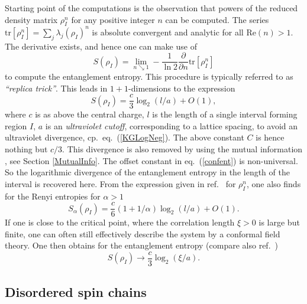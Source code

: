 \documentclass[12pt, rmp,floatfix,epsfig,graphics]{revtex4} %
\begin{document}
Starting point of the computations is the observation that powers 
of the reduced density matrix $\rho_I^n$ for any positive integer 
$n$ can be computed. The series 
$\text{tr}[\rho_I^n]= \sum_j \lambda_j(\rho_I)^n$ 
is absolute convergent and analytic for all
$\text{Re}(n)>1$. The derivative exists, and hence one can make use of
\begin{equation*}
        S(\rho_I)=\lim_{n\searrow 1}
        -\frac{1}{\ln 2} \frac{\partial}{\partial n}\text{tr}[\rho_I^n]
\end{equation*}
to compute the entanglement entropy. This procedure is 
typically referred to as {\it ``replica trick''}.
This leads in $1+1$-dimensions to the expression \cite{Larsen}
\begin{equation}
        \label{confent}
        S(\rho_I) = \frac{c}{3}\log_2(l/a)
        +O(1),
\end{equation}
where $c$ is as above the central charge, $l$ is the length of a 
single interval forming region $I$, $a$ is an {\it ultraviolet cutoff}, 
corresponding to a lattice spacing, to avoid an ultraviolet 
divergence, cp.\ eq.\ (\ref{KGLogNeg}). The above
constant $C$ is hence nothing but $c/3$.
This divergence is also removed by using the mutual 
information \cite{Casini}, see Section \ref{MutualInfo}. The 
offset constant in eq.\ (\ref{confent}) is non-universal.  So 
the logarithmic divergence of the entanglement entropy in the 
length of the interval is recovered here. From the expression given 
in ref.\ \cite{Calabrese} for $\rho_I^n$, one also finds for the 
Renyi entropies for $\alpha>1$
\begin{equation*}
        S_\alpha (\rho_I) = \frac{c}{6}\left(1+1/\alpha \right)\log_2(l/a) +O(1).
\end{equation*}
If one is close to the critical point, where the correlation 
length $\xi>0$ is large but finite, one can often still effectively 
describe the system by a conformal field theory. One then obtains
for the entanglement entropy \cite{Calabrese} 
(compare also ref.\ \cite{HuertaJSTAT})
\begin{equation*}
        S(\rho_I) \rightarrow \frac{c}{3} \log_2(\xi/a).
\end{equation*}

\subsection{Disordered spin chains}
\end{document}
